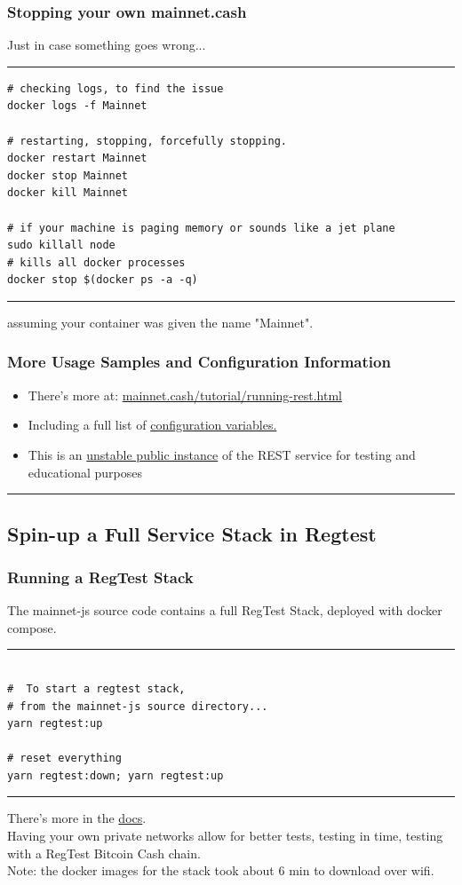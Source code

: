 \documentclass{beamer}
\begin{document}
\begin{frame}[fragile]
    \frametitle{Stopping your own mainnet.cash}
      Just in case something \alert{goes wrong}...
    \rule{\textwidth}{0.6pt}
    \tiny
    \begin{verbatim}
# checking logs, to find the issue
docker logs -f Mainnet

# restarting, stopping, forcefully stopping.
docker restart Mainnet
docker stop Mainnet
docker kill Mainnet

# if your machine is paging memory or sounds like a jet plane
sudo killall node 
# kills all docker processes
docker stop $(docker ps -a -q)
    \end{verbatim}
\rule{\textwidth}{0.6pt}
assuming your container was given the name "Mainnet".\\
\end{frame}

\begin{frame}[fragile]
    \frametitle{More Usage Samples and Configuration Information}
  \begin{itemize}
    \item
      There's more at: \href{https://mainnet.cash/tutorial/running-rest.html}{mainnet.cash/tutorial/running-rest.html}
    \item
      Including a full list of \href{https://mainnet.cash/tutorial/running-rest.html#configuration}{configuration variables.}
    \item
      This is an \href{https://rest-unstable.mainnet.cash/api-docs/}{unstable public instance} of the REST service for testing and educational purposes
    \end{itemize}
        
\rule{\textwidth}{0.9pt}
\end{frame}

\subsection[RegTest Stack]{Spin-up a Full Service Stack in Regtest}

\begin{frame}[fragile]
    \frametitle{Running a RegTest Stack}
      The mainnet-js source code contains a full RegTest Stack, deployed with docker compose.
    \rule{\textwidth}{0.6pt}
    \tiny
    \begin{verbatim}

#  To start a regtest stack,
# from the mainnet-js source directory...
yarn regtest:up

# reset everything
yarn regtest:down; yarn regtest:up
    \end{verbatim}
\rule{\textwidth}{0.6pt}
There's more in the \href{http://mainnet.cash/tutorial/#regtest-wallets}{docs}.\\


Having your own private networks allow for better tests, testing in time, testing with a RegTest Bitcoin Cash chain. \\ 
Note: the docker images for the stack took about 6 min to download over wifi.
\end{frame}
\end{document}
